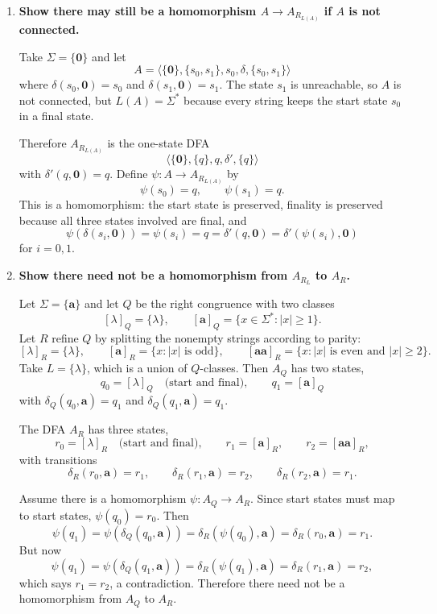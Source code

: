 \begin{enumerate}[{3.}1.]
If there were a homomorphism $\psi:A\to A_{R_{L(A)}}$, then $\psi(s_0)=q$ because
$s_0$ is the start state. But a homomorphism must also preserve finality:
\[
s_1\in F_A \Leftrightarrow \psi(s_1)\in F_{R_{L(A)}}.
\]
This is impossible, because $q$ is the only state of $A_{R_{L(A)}}$ and $q$ is
not final. Hence no such homomorphism exists.

\item \textbf{Show there may still be a homomorphism $A\to A_{R_{L(A)}}$ if $A$ is not connected.}

Take $\Sigma=\{\pmb{0}\}$ and let
\[
A=\langle \{\pmb{0}\},\{s_0,s_1\},s_0,\delta,\{s_0,s_1\}\rangle
\]
where $\delta(s_0,\pmb{0})=s_0$ and $\delta(s_1,\pmb{0})=s_1$. The state $s_1$ is
unreachable, so $A$ is not connected, but $L(A)=\Sigma^*$ because every string
keeps the start state $s_0$ in a final state.

Therefore $A_{R_{L(A)}}$ is the one-state DFA
\[
\langle \{\pmb{0}\},\{q\},q,\delta',\{q\}\rangle
\]
with $\delta'(q,\pmb{0})=q$. Define $\psi:A\to A_{R_{L(A)}}$ by
\[
\psi(s_0)=q,\qquad \psi(s_1)=q.
\]
This is a homomorphism: the start state is preserved, finality is preserved
because all three states involved are final, and
\[
\psi(\delta(s_i,\pmb{0}))=\psi(s_i)=q=\delta'(q,\pmb{0})
=\delta'(\psi(s_i),\pmb{0})
\]
for $i=0,1$.

\item \textbf{Show there need not be a homomorphism from $A_{R_L}$ to $A_R$.}

Let $\Sigma=\{\pmb{a}\}$ and let $Q$ be the right congruence with two classes
\[
[\lambda]_Q=\{\lambda\}, \qquad [\pmb{a}]_Q=\{x\in\Sigma^*:|x|\geq 1\}.
\]
Let $R$ refine $Q$ by splitting the nonempty strings according to parity:
\[
[\lambda]_R=\{\lambda\},\qquad
[\pmb{a}]_R=\{x:|x|\text{ is odd}\},\qquad
[\pmb{aa}]_R=\{x:|x|\text{ is even and }|x|\geq 2\}.
\]
Take $L=\{\lambda\}$, which is a union of $Q$-classes. Then
$A_Q$ has two states,
\[
q_0=[\lambda]_Q \quad\text{(start and final)},\qquad q_1=[\pmb{a}]_Q
\]
with $\delta_Q(q_0,\pmb{a})=q_1$ and $\delta_Q(q_1,\pmb{a})=q_1$.

The DFA $A_R$ has three states,
\[
r_0=[\lambda]_R \quad\text{(start and final)},\qquad
r_1=[\pmb{a}]_R,\qquad
r_2=[\pmb{aa}]_R,
\]
with transitions
\[
\delta_R(r_0,\pmb{a})=r_1,\qquad
\delta_R(r_1,\pmb{a})=r_2,\qquad
\delta_R(r_2,\pmb{a})=r_1.
\]

Assume there is a homomorphism $\psi:A_Q\to A_R$. Since start states must map to
start states, $\psi(q_0)=r_0$. Then
\[
\psi(q_1)=\psi(\delta_Q(q_0,\pmb{a}))
        =\delta_R(\psi(q_0),\pmb{a})
        =\delta_R(r_0,\pmb{a})
        =r_1.
\]
But now
\[
\psi(q_1)=\psi(\delta_Q(q_1,\pmb{a}))
        =\delta_R(\psi(q_1),\pmb{a})
        =\delta_R(r_1,\pmb{a})
        =r_2,
\]
which says $r_1=r_2$, a contradiction. Therefore there need not be a
homomorphism from $A_Q$ to $A_R$.


\end{enumerate}
